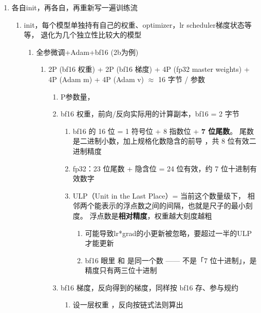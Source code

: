 \documentclass[UTF8,fontset=fandol]{ctexart}
\begin{document}
\begin{enumerate}
  \item 各自init，再各自，再重新写一遍训练流
  \begin{enumerate}
    \item init，每个模型单独持有自己的权重、optimizer，lr scheduler梯度状态等等，
      退化为几个独立性比较大的模型
    \begin{enumerate}
      \item 全参微调+Adam+bf16 (2b为例)
      \begin{enumerate}
        \item 2P (bf16 权重) + 2P (bf16 梯度) + 4P (fp32 master weights) +
          4P (Adam m)  + 4P (Adam v)  $\approx$ 16 字节 / 参数
        \begin{enumerate}
          \item P参数量，                                        %
          \item bf16 权重，前向/反向实际用的计算副本，bf16 = 2 字节
          \begin{enumerate}
            \item bf16 的 16 位 = 1 符号位 + 8 指数位 + \textbf{7 位尾数}。
              尾数是二进制小数，加上规格化数隐含的前导 ，共 8 位有效二进制精度
            \item fp32：23 位尾数 + 隐含位 = 24 位有效，约 7 位十进制有效数字
            \item ULP（Unit in the Last Place）= 当前这个数量级下，
              相邻两个能表示的浮点数之间的间隔，也就是尺子的最小刻度。
              浮点数是\textbf{相对精度}，权重越大刻度越粗
            \begin{enumerate}
              \item 可能导致lr*grad的小更新被忽略，要超过一半的ULP才能更新
              \item bf16 眼里  和  是同一个数 ——
                不是「7 位十进制」，是精度只有两三位十进制
            \end{enumerate}
          \end{enumerate}
          \item bf16 梯度，反向得到的梯度，同样按 bf16 存、参与规约
          \begin{enumerate}
            \item 设一层权重 ，反向按链式法则算出

\end{enumerate}
\end{enumerate}
\end{enumerate}
\end{enumerate}
\end{enumerate}
\end{enumerate}
\end{document}
